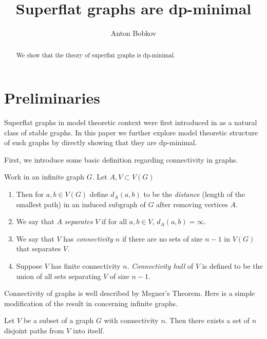\documentclass{amsart}
\begin{document}
\title{Superflat graphs are dp-minimal}
\author{Anton Bobkov}

\begin{abstract}
	We show that the theory of superflat graphs is dp-minimal.
\end{abstract}

\maketitle

\section{Preliminaries}

Superflat graphs in model theoretic context were first introduced in \cite{stable_graphs} as a natural class of stable graphs. In this paper we further explore model theoretic structure of such graphs by directly showing that they are dp-minimal.

First, we introduce some basic definition regarding connectivity in graphs.
\begin{Definition}
	Work in an infinite graph $G$. Let $A, V \subset V(G)$
	\begin{enumerate}
		\item Then for $a,b \in V(G)$ define $d_A(a,b)$ to be the \emph{distance} (length of the smallest path) in an induced subgraph of $G$ after removing vertices $A$.
		\item We say that $A$ \emph{separates} $V$ if for all $a,b \in V$, $d_A(a,b) = \infty$.
		\item We say that $V$ has \emph{connectivity} $n$ if there are no sets of size $n-1$ in $V(G)$ that separates $V$.
		\item Suppose $V$ has finite connectivity $n$. \emph{Connectivity hull} of $V$ is defined to be the union of all sets separating $V$ of size $n-1$.
	\end{enumerate}
\end{Definition}

Connectivity of graphs is well described by Megner's Theorem. Here is a simple modification of the result in \cite{infinite_megner} concerning infinite graphs.

\begin{Theorem}
	Let $V$ be a subset of a graph $G$ with connectivity $n$. Then there exists a set of $n$ disjoint paths from $V$ into itself.
\end{Theorem}
\end{document}
